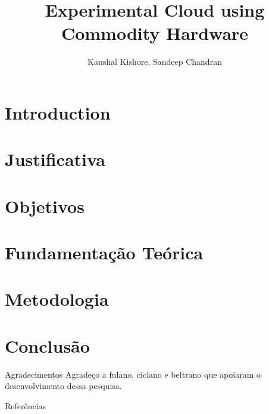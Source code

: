 \documentclass[aspectratio=169,11pt]{beamer}
\title[Interim Report]{Experimental Cloud using Commodity Hardware}
\author[111601008]{Kaushal Kishore, Sandeep Chandran}
\begin{document}


\section{Introduction} 


\section{Justificativa}


\section{Objetivos}


\section{Fundamentação Teórica}


\section{Metodologia}


% 

\section{Conclusão}


\begin{frame}{Agradecimentos}
    \large{Agradeço a fulano, ciclano e beltrano que apoiaram o desenvolvimento dessa pesquisa.}
\end{frame}


\nocite{*}
\begin{frame}[allowframebreaks]{Referências}


\end{frame}


\begin{frame}
\titlepage 
\end{frame}
\end{document}
